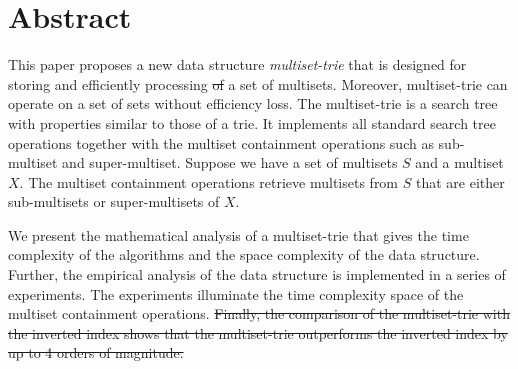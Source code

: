 \documentclass[10pt,letterpaper]{article}
\providecommand{\DIFdeltex}[1]{{\protect\color{red}\sout{#1}}}                      %
\providecommand{\DIFdelbegin}{} %
\providecommand{\DIFdelend}{} %
\providecommand{\DIFdel}[1]{\texorpdfstring{\DIFdeltex{#1}}{}} %
\newcommand{\DIFscaledelfig}{0.5}
\newlength{\DIFdelgraphicswidth} %
\newlength{\DIFdelgraphicsheight} %
\newcommand{\DIFdelincludegraphics}[2][]{%
\sbox{\DIFdelgraphicsbox}{\DIFOincludegraphics[#1]{#2}}%
\settoboxwidth{\DIFdelgraphicswidth}{\DIFdelgraphicsbox} %
\settoboxtotalheight{\DIFdelgraphicsheight}{\DIFdelgraphicsbox} %
\scalebox{\DIFscaledelfig}{%
\parbox[b]{\DIFdelgraphicswidth}{\usebox{\DIFdelgraphicsbox}\\[-\baselineskip] \rule{\DIFdelgraphicswidth}{0em}}\llap{\resizebox{\DIFdelgraphicswidth}{\DIFdelgraphicsheight}{%
\setlength{\unitlength}{\DIFdelgraphicswidth}%
\begin{picture}(1,1)%
\thicklines\linethickness{2pt} %
{\color[rgb]{1,0,0}\put(0,0){\framebox(1,1){}}}%
{\color[rgb]{1,0,0}\put(0,0){\line( 1,1){1}}}%
{\color[rgb]{1,0,0}\put(0,1){\line(1,-1){1}}}%
\end{picture}%
}\hspace*{3pt}}} %
} %
\DeclareRobustCommand{\DIFdelbegin}{\DIFOdelbegin \let\includegraphics\DIFdelincludegraphics} %
\DeclareRobustCommand{\DIFdelend}{\DIFOaddend \let\includegraphics\DIFOincludegraphics} %
\begin{document}
\section*{Abstract}
This paper proposes a new data structure \emph{multiset-trie} that is designed for storing and efficiently processing \DIFdelbegin \DIFdel{of }\DIFdelend a set of multisets. Moreover, multiset-trie can operate on a set of sets without efficiency loss.
%
The multiset-trie is a search tree with properties similar to those of a trie. It implements all standard search tree operations together with the multiset containment operations such as sub-multiset and super-multiset. Suppose we have a set of multisets $S$ and a multiset $X$. The multiset containment operations retrieve multisets from $S$ that are either sub-multisets or super-multisets of $X$. 

We present the mathematical analysis of a multiset-trie that gives the time complexity of the algorithms and the space complexity of the data structure. Further, the empirical analysis of the data structure is implemented in a series of experiments. The experiments illuminate the time complexity space of the multiset containment operations.
\DIFdelbegin \DIFdel{Finally, the comparison of the multiset-trie with the inverted index shows that the multiset-trie outperforms the inverted index by up to 4 orders of magnitude.
%
}\DIFdelend %

\newpage
\tableofcontents


\end{document}
